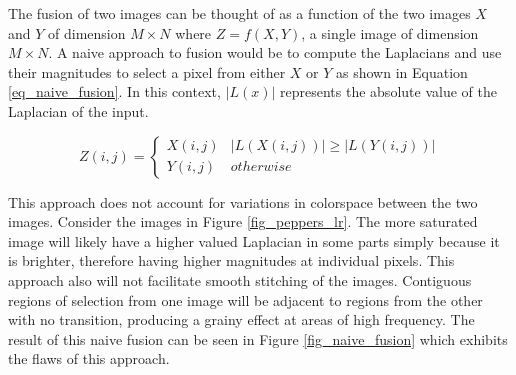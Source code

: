 \documentclass{article}
\begin{document}
The fusion of two images can be thought of as a function of the two images $X$ and $Y$ of dimension $M \times N$ where $Z = f(X, Y)$, a single image of dimension $M \times N$. A naive approach to fusion would be to compute the Laplacians and use their magnitudes to select a pixel from either $X$ or $Y$ as shown in Equation \ref{eq_naive_fusion}. In this context, $|L(x)|$ represents the absolute value of the Laplacian of the input.

\begin{equation}
Z(i,j)=
\begin{cases}
X(i,j) & |L(X(i,j))| \ge |L(Y(i,j))| \\
Y(i,j) & otherwise
\end{cases}
\label{eq_naive_fusion}
\end{equation}

This approach does not account for variations in colorspace between the two images. Consider the images in Figure \ref{fig_peppers_lr}. The more saturated image will likely have a higher valued Laplacian in some parts simply because it is brighter, therefore having higher magnitudes at individual pixels. This approach also will not facilitate smooth stitching of the images. Contiguous regions of selection from one image will be adjacent to regions from the other with no transition, producing a grainy effect at areas of high frequency. The result of this naive fusion can be seen in Figure \ref{fig_naive_fusion} which exhibits the flaws of this approach.
\end{document}
